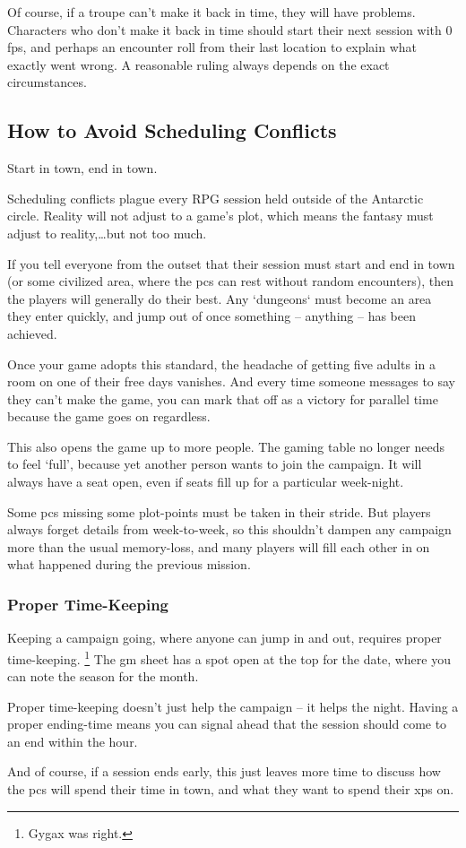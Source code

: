 \begin{multicols}{2}
Of course, if a troupe can't make it back in time, they will have problems.
Characters who don't make it back in time should start their next session with 0 \glspl{fp}, and perhaps an encounter roll from their last location to explain what exactly went wrong.
A reasonable ruling always depends on the exact circumstances.

\subsection{How to Avoid Scheduling Conflicts}

Start in town, end in town.

Scheduling conflicts plague every RPG session held outside of the Antarctic circle.
Reality will not adjust to a game's plot, which means the fantasy must adjust to reality,\ldots but not too much.

If you tell everyone from the outset that their session must start and end in town (or some civilized area, where the \glspl{pc} can rest without random encounters), then the players will generally do their best.
Any `dungeons` must become an area they enter quickly, and jump out of once something -- anything -- has been achieved.

Once your game adopts this standard, the headache of getting five adults in a room on one of their free days vanishes.
And every time someone messages to say they can't make the game, you can mark that off as a victory for parallel time because the game goes on regardless.

This also opens the game up to more people.
The gaming table no longer needs to feel `full', because yet another person wants to join the campaign.
It will always have a seat open, even if seats fill up for a particular week-night.

Some \glspl{pc} missing some plot-points must be taken in their stride.
But players always forget details from week-to-week, so this shouldn't dampen any campaign more than the usual memory-loss, and many players will fill each other in on what happened during the previous mission.

\subsubsection{Proper Time-Keeping}

Keeping a campaign going, where anyone can jump in and out, requires proper time-keeping.%
\footnote{Gygax was right.}
The \gls{gm} sheet has a spot open at the top for the date, where you can note the season for the month.

Proper time-keeping doesn't just help the campaign -- it helps the night.
Having a proper ending-time means you can signal ahead that the session should come to an end within the hour.

And of course, if a session ends early, this just leaves more time to discuss how the \glspl{pc} will spend their time in town, and what they want to spend their \glspl{xp} on.

\end{multicols}


